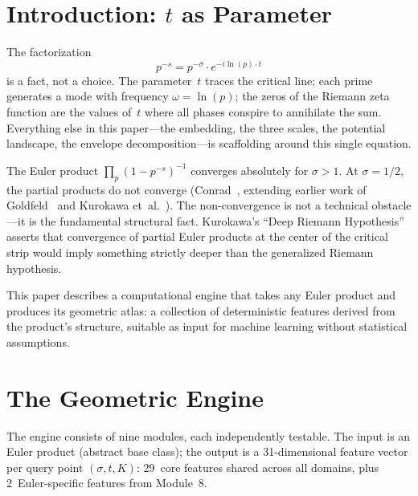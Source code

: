 \documentclass[11pt]{amsart}
\begin{document}
\section{Introduction: $t$ as Parameter}
\label{sec:intro}

The factorization
\begin{equation}\label{eq:fundamental}
  p^{-s} = p^{-\sigma} \cdot e^{-i\ln(p)\cdot t}
\end{equation}
is a fact, not a choice. The parameter~$t$ traces the critical line; each
prime generates a mode with frequency $\omega = \ln(p)$; the zeros of the
Riemann zeta function are the values of~$t$ where all phases conspire to
annihilate the sum. Everything else in this paper---the embedding, the three
scales, the potential landscape, the envelope decomposition---is scaffolding
around this single equation.

The Euler product $\prod_p (1 - p^{-s})^{-1}$ converges absolutely for
$\sigma > 1$. At $\sigma = 1/2$, the partial products do not converge
(Conrad~\cite{Conrad2005}, extending earlier work of Goldfeld~\cite{Goldfeld1976} and Kurokawa
et~al.~\cite{Kurokawa1992}). The non-convergence is not a technical obstacle---it is the
fundamental structural fact. Kurokawa's ``Deep Riemann Hypothesis''~\cite{Kurokawa1992} asserts
that convergence of partial Euler products at the center of the critical
strip would imply something strictly deeper than the generalized Riemann
hypothesis.

This paper describes a computational engine that takes any Euler product and
produces its geometric atlas: a collection of deterministic features derived
from the product's structure, suitable as input for machine learning without
statistical assumptions.


\section{The Geometric Engine}
\label{sec:engine}

The engine consists of nine modules, each independently testable. The input
is an Euler product (abstract base class); the output is a 31-dimensional
feature vector per query point $(\sigma, t, K)$: 29~core features shared
across all domains, plus 2~Euler-specific features from Module~8.
\end{document}

